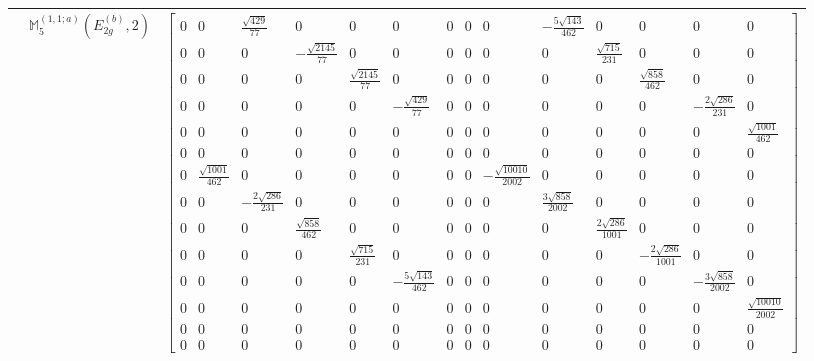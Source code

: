 \documentclass[fleqn,8pt,landscape]{jsarticle}
\begin{document}
\begin{longtable}{ccc}
$  $ & $ \mathbb{M}_{5}^{(1,1;a)}(E_{2g}^{(b)},2) $ & $ \begin{bmatrix} 0 & 0 & \frac{\sqrt{429}}{77} & 0 & 0 & 0 & 0 & 0 & 0 & - \frac{5 \sqrt{143}}{462} & 0 & 0 & 0 & 0 \\ 0 & 0 & 0 & - \frac{\sqrt{2145}}{77} & 0 & 0 & 0 & 0 & 0 & 0 & \frac{\sqrt{715}}{231} & 0 & 0 & 0 \\ 0 & 0 & 0 & 0 & \frac{\sqrt{2145}}{77} & 0 & 0 & 0 & 0 & 0 & 0 & \frac{\sqrt{858}}{462} & 0 & 0 \\ 0 & 0 & 0 & 0 & 0 & - \frac{\sqrt{429}}{77} & 0 & 0 & 0 & 0 & 0 & 0 & - \frac{2 \sqrt{286}}{231} & 0 \\ 0 & 0 & 0 & 0 & 0 & 0 & 0 & 0 & 0 & 0 & 0 & 0 & 0 & \frac{\sqrt{1001}}{462} \\ 0 & 0 & 0 & 0 & 0 & 0 & 0 & 0 & 0 & 0 & 0 & 0 & 0 & 0 \\ 0 & \frac{\sqrt{1001}}{462} & 0 & 0 & 0 & 0 & 0 & 0 & - \frac{\sqrt{10010}}{2002} & 0 & 0 & 0 & 0 & 0 \\ 0 & 0 & - \frac{2 \sqrt{286}}{231} & 0 & 0 & 0 & 0 & 0 & 0 & \frac{3 \sqrt{858}}{2002} & 0 & 0 & 0 & 0 \\ 0 & 0 & 0 & \frac{\sqrt{858}}{462} & 0 & 0 & 0 & 0 & 0 & 0 & \frac{2 \sqrt{286}}{1001} & 0 & 0 & 0 \\ 0 & 0 & 0 & 0 & \frac{\sqrt{715}}{231} & 0 & 0 & 0 & 0 & 0 & 0 & - \frac{2 \sqrt{286}}{1001} & 0 & 0 \\ 0 & 0 & 0 & 0 & 0 & - \frac{5 \sqrt{143}}{462} & 0 & 0 & 0 & 0 & 0 & 0 & - \frac{3 \sqrt{858}}{2002} & 0 \\ 0 & 0 & 0 & 0 & 0 & 0 & 0 & 0 & 0 & 0 & 0 & 0 & 0 & \frac{\sqrt{10010}}{2002} \\ 0 & 0 & 0 & 0 & 0 & 0 & 0 & 0 & 0 & 0 & 0 & 0 & 0 & 0 \\ 0 & 0 & 0 & 0 & 0 & 0 & 0 & 0 & 0 & 0 & 0 & 0 & 0 & 0 \end{bmatrix} $ \\ \hline
\end{longtable}
\end{document}
